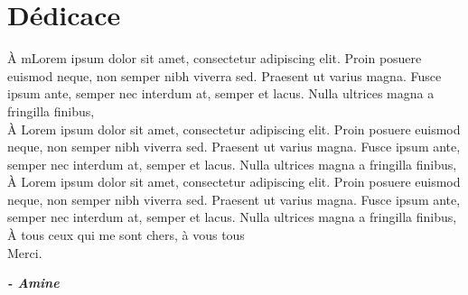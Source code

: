 \section*{Dédicace}

\begin{fquote}
\begin{center}
\large{

\uppercase{à} mLorem ipsum dolor sit amet, consectetur adipiscing elit. Proin posuere euismod neque, non semper nibh viverra sed. Praesent ut varius magna. Fusce ipsum ante, semper nec interdum at, semper et lacus. Nulla ultrices magna a fringilla finibus,\\[12pt]
\uppercase{à} Lorem ipsum dolor sit amet, consectetur adipiscing elit. Proin posuere euismod neque, non semper nibh viverra sed. Praesent ut varius magna. Fusce ipsum ante, semper nec interdum at, semper et lacus. Nulla ultrices magna a fringilla finibus,\\[12pt]
\uppercase{à} Lorem ipsum dolor sit amet, consectetur adipiscing elit. Proin posuere euismod neque, non semper nibh viverra sed. Praesent ut varius magna. Fusce ipsum ante, semper nec interdum at, semper et lacus. Nulla ultrices magna a fringilla finibus,\\[12pt]
\uppercase{à} tous ceux qui me sont chers, à vous tous\\[12pt]
Merci.
}
\end{center}
\bigskip
\medskip
\end{fquote}

\begin{adjustwidth}{2cm}{1cm}
\hspace*{\fill} \textbf{\textit{\large{- Amine}}}
\end{adjustwidth}

\clearpage
